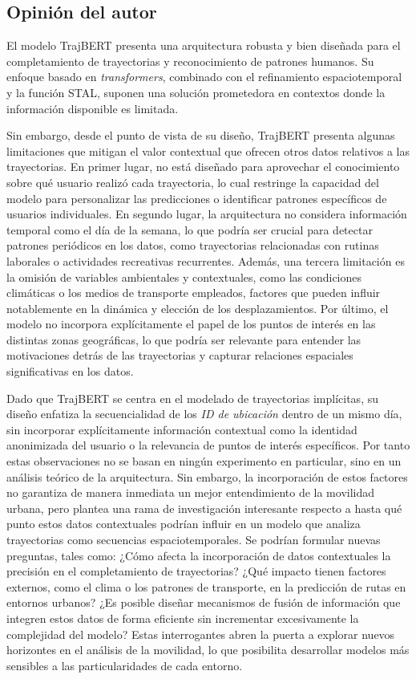 \subsection{Opinión del autor}

El modelo TrajBERT presenta una arquitectura robusta y bien diseñada para el completamiento de trayectorias y reconocimiento de patrones humanos. Su enfoque basado en \textit{transformers}, combinado con el refinamiento espaciotemporal y la función STAL, suponen una solución prometedora en contextos donde la información disponible es limitada.

Sin embargo, desde el punto de vista de su diseño, TrajBERT presenta algunas limitaciones que mitigan el valor contextual que ofrecen otros datos relativos a las trayectorias. En primer lugar, no está diseñado para aprovechar el conocimiento sobre qué usuario realizó cada trayectoria, lo cual restringe la capacidad del modelo para personalizar las predicciones o identificar patrones específicos de usuarios individuales. En segundo lugar, la arquitectura no considera información temporal como el día de la semana, lo que podría ser crucial para detectar patrones periódicos en los datos, como trayectorias relacionadas con rutinas laborales o actividades recreativas recurrentes. Además, una tercera limitación es la omisión de variables ambientales y contextuales, como las condiciones climáticas o los medios de transporte empleados, factores que pueden influir notablemente en la dinámica y elección de los desplazamientos. Por último, el modelo no incorpora explícitamente el papel de los puntos de interés en las distintas zonas geográficas, lo que podría ser relevante para entender las motivaciones detrás de las trayectorias y capturar relaciones espaciales significativas en los datos.

Dado que TrajBERT se centra en el modelado de trayectorias implícitas, su diseño enfatiza la secuencialidad de los \textit{ID de ubicación} dentro de un mismo día, sin incorporar explícitamente información contextual como la identidad anonimizada del usuario o la relevancia de puntos de interés específicos. Por tanto estas observaciones no se basan en ningún experimento en particular, sino en un análisis teórico de la arquitectura. Sin embargo, la incorporación de estos factores no garantiza de manera inmediata un mejor entendimiento de la movilidad urbana, pero plantea una rama de investigación interesante respecto a hasta qué punto estos datos contextuales podrían influir en un modelo que analiza trayectorias como secuencias espaciotemporales. Se podrían formular nuevas preguntas, tales como: ¿Cómo afecta la incorporación de datos contextuales la precisión en el completamiento de trayectorias? ¿Qué impacto tienen factores externos, como el clima o los patrones de transporte, en la predicción de rutas en entornos urbanos? ¿Es posible diseñar mecanismos de fusión de información que integren estos datos de forma eficiente sin incrementar excesivamente la complejidad del modelo? Estas interrogantes abren la puerta a explorar nuevos horizontes en el análisis de la movilidad, lo que posibilita desarrollar modelos más sensibles a las particularidades de cada entorno.

